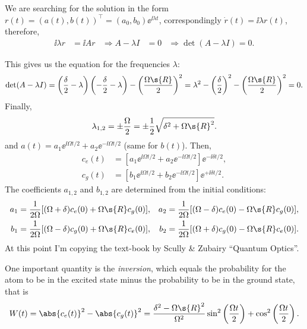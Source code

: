 \documentclass[fontsize=9pt,bookmarkpackage=false]{scrartcl}
\begin{document}
We are searching for the solution in the form $r(t) = (a(t), b(t))^\intercal = (a_0 , b_0) \ee^{ \ii \lambda t }$, correspondingly $\dot r(t) = \ii \lambda r(t)$, therefore,
\begin{align}
  \ii \lambda r & = \ii A r
  &
  \Longrightarrow
  A - \lambda I & = 0
  &
  \Longrightarrow
  \det( A - \lambda I ) = 0.
\end{align}

This gives us the equation for the frequencies $\lambda$:
\begin{equation}
  \det( A - \lambda I )
  =
  \left( \frac{ \delta }{ 2 } - \lambda \right)\left( - \frac{ \delta }{ 2 } - \lambda \right)
  - \left( \frac{ \Omega\s{R} }{ 2 }  \right)^2
  = \lambda^2 - \left( \frac{ \delta }{ 2 } \right)^2 - \left( \frac{ \Omega\s{R} }{ 2 } \right)^2 = 0.
\end{equation}
Finally,
\begin{equation}
  \lambda_{1,2 } = \pm \frac \Omega 2 = \pm \frac 12 \sqrt{ \delta^2 + \Omega\s{R}^2 }.
\end{equation}
and $a(t) = a_1 \ee^{ \ii \Omega t / 2 } + a_2 \ee^{ - \ii \Omega t / 2}$ (same for $b(t)$).
Then,
\begin{align}
  c_e (t) & = [
  a_1 \ee^{ \ii \Omega t / 2 }
  +
  a_2 \ee^{ - \ii \Omega t / 2 }
  ] \ee^{ - \ii \delta t / 2 },
  \\
  c_g (t) & = [
  b_1 \ee^{ \ii \Omega t / 2 }
  +
  b_2 \ee^{ - \ii \Omega t / 2 }
  ] \ee^{ + \ii \delta t / 2 }.
\end{align}
The coefficients $a_{1,2}$ and $b_{1,2}$ are determined from the initial conditions:
\begin{align}
  a_1 & = \frac{ 1 }{ 2 \Omega } [ ( \Omega + \delta ) c_e (0) + \Omega\s{R} c_g (0) ], &
  a_2 & = \frac{ 1 }{ 2 \Omega } [ ( \Omega - \delta ) c_e (0) - \Omega\s{R} c_g (0) ],
  \\
  b_1 & = \frac{ 1 }{ 2 \Omega } [ ( \Omega - \delta ) c_g (0) + \Omega\s{R} c_e (0) ], &
  b_2 & = \frac{ 1 }{ 2 \Omega } [ ( \Omega + \delta ) c_g (0) - \Omega\s{R} c_e (0) ].
\end{align}
At this point I'm copying the text-book by Scully \& Zubairy ``Quantum Optics''.

One important quantity is the \emph{inversion}, which equals the probability for the atom to be in the excited state minus the probability to be in the ground state, that is
\begin{equation}
  W(t) = \abs{ c_e (t) }^2 - \abs{ c_g (t) }^2 =
  \frac{ \delta^2 - \Omega\s{R}^2 }{ \Omega^2 } 
  \sin^2 \left( \frac{ \Omega t }{ 2 } \right) +
  \cos^2 \left( \frac{ \Omega t }{ 2 } \right).
\end{equation}
\end{document}
